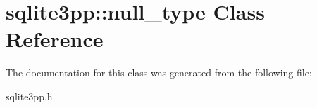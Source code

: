 \hypertarget{classsqlite3pp_1_1null__type}{\section{sqlite3pp\-:\-:null\-\_\-type Class Reference}
\label{classsqlite3pp_1_1null__type}
}


The documentation for this class was generated from the following file\-:\begin{DoxyCompactItemize}
\item 
sqlite3pp.\-h\end{DoxyCompactItemize}
